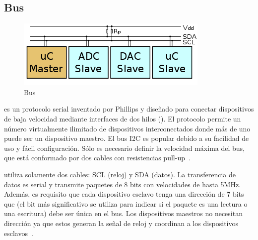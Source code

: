 %
%


\subsection{Bus \IIC}%
\label{seq:intro-i2c}
\begin{figure}
	\centering
	\includegraphics[width=0.3\columnwidth]{img/i2c-bus.png}
	\caption{Bus \IIC}%
	\label{fig:iic-bus}
\end{figure}
\IIC es un protocolo serial inventado por Phillips y diseñado para conectar dispositivos de baja velocidad mediante interfaces de dos hilos ().
El protocolo permite un número virtualmente ilimitado de dispositivos interconectados donde más de uno puede ser un dispositivo maestro.
El bus I2C es popular debido a su facilidad de uso y fácil configuración.
Sólo es necesario definir la velocidad máxima del bus, que está conformado por dos cables con resistencias pull-up~.

\IIC utiliza solamente dos cables: SCL (reloj) y SDA (datos).
La transferencia de datos es serial y transmite paquetes de 8 bits con velocidades de hasta 5MHz.
Además, es requisito que cada dispositivo esclavo tenga una dirección de 7 bits que (el bit más significativo se utiliza para indicar si el paquete es una lectura o una escritura) debe ser única en el bus.
Los dispositivos maestros no necesitan dirección ya que estos generan la señal de reloj y coordinan a los dispositivos esclavos~.
